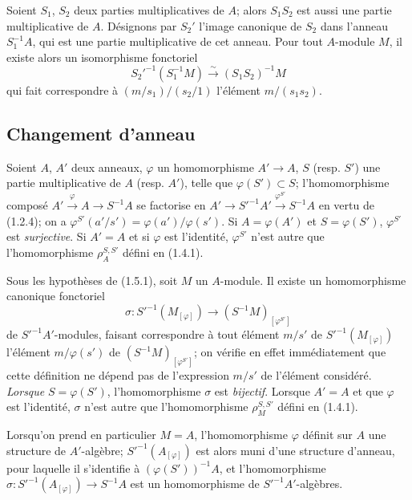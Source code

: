 \begin{env}[1.4.6]
\label{0.1.4.6-fr}
Soient $S_1$, $S_2$ deux parties multiplicatives de $A$; alors $S_1S_2$ est aussi une partie multiplicative de $A$.
Désignons par $S_2'$ l'image canonique de $S_2$ dans l'anneau $S_1^{-1}A$, qui est une partie multiplicative de cet anneau.
Pour tout $A$-module $M$, il existe alors un isomorphisme fonctoriel
\[
  S_2'^{-1}(S_1^{-1}M)\xrightarrow{\sim}(S_1S_2)^{-1}M
\]
qui fait correspondre à $(m/s_1)/(s_2/1)$ l'élément $m/(s_1s_2)$.
\end{env}

\subsection{Changement d'anneau}
\label{subsection:0.1.5-fr}

\begin{env}[1.5.1]
\label{0.1.5.1-fr}
Soient $A$, $A'$ deux anneaux, $\varphi$ un homomorphisme $A'\to A$, $S$ (resp. $S'$) une partie multiplicative de $A$ (resp. $A'$), telle que $\varphi(S')\subset S$; l'homomorphisme composé
$A'\xrightarrow{\varphi}A\longrightarrow S^{-1}A$
se factorise en
$A'\longrightarrow S'^{-1}A'\xrightarrow{\varphi^{S'}}S^{-1}A$
en vertu de (1.2.4); on a $\varphi^{S'}(a'/s')=\varphi(a')/\varphi(s')$.
Si $A=\varphi(A')$ et $S=\varphi(S')$, $\varphi^{S'}$ est \emph{surjective}.
Si $A'=A$ et si $\varphi$ est l'identité, $\varphi^{S'}$ n'est autre que l'homomorphisme $\rho_A^{S,S'}$ défini en (1.4.1).
\end{env}

\begin{env}[1.5.2]
\label{0.1.5.2-fr}
Sous les hypothèses de (1.5.1), soit $M$ un $A$-module.
Il existe un homomorphisme canonique fonctoriel
\[
  \sigma:S'^{-1}(M_{[\varphi]})\longrightarrow
  (S^{-1}M)_{[\varphi^{S'}]}
\]
de $S'^{-1}A'$-modules, faisant correspondre à tout élément $m/s'$ de $S'^{-1}(M_{[\varphi]})$ l'élément $m/\varphi(s')$ de $(S^{-1}M)_{[\varphi^{S'}]}$; on vérifie en effet immédiatement que cette définition ne dépend pas de l'expression $m/s'$ de l'élément considéré.
\emph{Lorsque} $S=\varphi(S')$, l'homomorphisme $\sigma$ est \emph{bijectif}.
Lorsque $A'=A$ et que $\varphi$ est l'identité, $\sigma$ n'est autre que l'homomorphisme $\rho_M^{S,S'}$ défini en (1.4.1).

Lorsqu'on prend en particulier $M=A$, l'homomorphisme $\varphi$ définit sur $A$ une structure de $A'$-algèbre; $S'^{-1}(A_{[\varphi]})$ est alors muni d'une structure d'anneau, pour laquelle il s'identifie à $(\varphi(S'))^{-1}A$, et l'homomorphisme
$\sigma:S'^{-1}(A_{[\varphi]})\longrightarrow S^{-1}A$
est un homomorphisme de $S'^{-1}A'$-algèbres.
\end{env}

